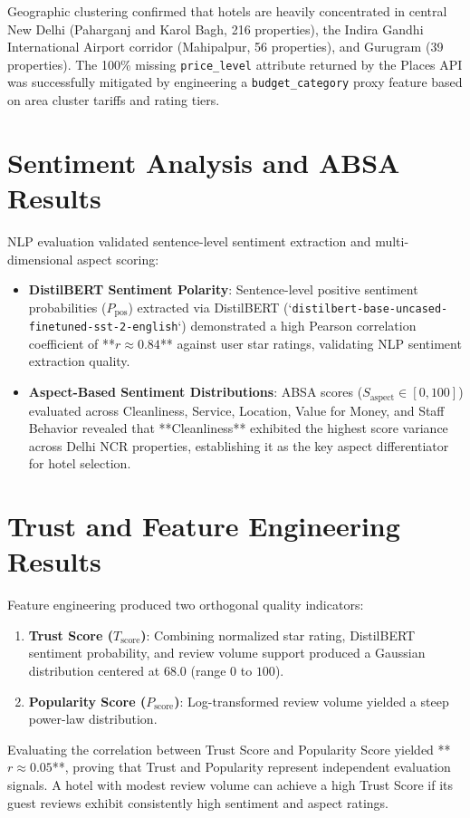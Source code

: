 Geographic clustering confirmed that hotels are heavily concentrated in central New Delhi (Paharganj and Karol Bagh, 216 properties), the Indira Gandhi International Airport corridor (Mahipalpur, 56 properties), and Gurugram (39 properties). The 100\% missing \texttt{price\_level} attribute returned by the Places API was successfully mitigated by engineering a \texttt{budget\_category} proxy feature based on area cluster tariffs and rating tiers.

\section{Sentiment Analysis and ABSA Results}
NLP evaluation validated sentence-level sentiment extraction and multi-dimensional aspect scoring:
\begin{itemize}
    \item \textbf{DistilBERT Sentiment Polarity}: Sentence-level positive sentiment probabilities ($P_{\text{pos}}$) extracted via DistilBERT (`\texttt{distilbert-base-uncased-finetuned-sst-2-english}`) demonstrated a high Pearson correlation coefficient of **$r \approx 0.84$** against user star ratings, validating NLP sentiment extraction quality.
    \item \textbf{Aspect-Based Sentiment Distributions}: ABSA scores ($S_{\text{aspect}} \in [0, 100]$) evaluated across Cleanliness, Service, Location, Value for Money, and Staff Behavior revealed that **Cleanliness** exhibited the highest score variance across Delhi NCR properties, establishing it as the key aspect differentiator for hotel selection.
\end{itemize}

\section{Trust and Feature Engineering Results}
Feature engineering produced two orthogonal quality indicators:
\begin{enumerate}
    \item \textbf{Trust Score ($T_{\text{score}}$)}: Combining normalized star rating, DistilBERT sentiment probability, and review volume support produced a Gaussian distribution centered at $68.0$ (range $0$ to $100$).
    \item \textbf{Popularity Score ($P_{\text{score}}$)}: Log-transformed review volume yielded a steep power-law distribution.
\end{enumerate}

Evaluating the correlation between Trust Score and Popularity Score yielded **$r \approx 0.05$**, proving that Trust and Popularity represent independent evaluation signals. A hotel with modest review volume can achieve a high Trust Score if its guest reviews exhibit consistently high sentiment and aspect ratings.

